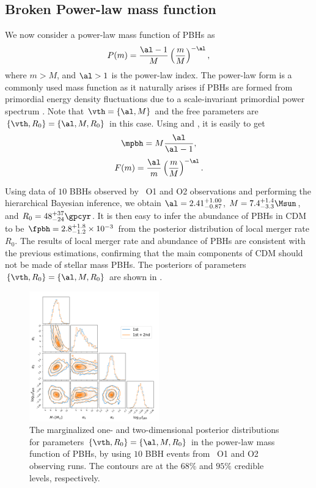 \documentclass[
reprint,           %
superscriptaddress,%
amsmath,           %
amssymb,           %
aps,               %
prd,               %
notitlepage,       %
longbibliography,  %
floatfix,          %
showkeys,          %
]{revtex4-1}
\def\({\left(}
\def\){\right)}
\def\e{\begin{equation}}
\def\q{\end{equation}}
\begin{document}
\subsection{Broken Power-law mass function}
We now consider a power-law mass function of PBHs as \cite{Carr:1975qj}
\e\label{bpower} 
P(m) = \frac{\al-1}{M} \(\frac{m}{M}\)^{-\al},
\q
where $m>M$, and $\al>1$ is the power-law index. The power-law form is a commonly used mass function as it naturally arises if PBHs are formed from primordial energy density fluctuations due to a scale-invariant primordial power spectrum \cite{Carr:2016drx,Carr:2017jsz}.
Note that $\vth=\{\al, M\}$ and the free parameters are 
$\{\vth, R_0\} = \{\al, M, R_0\}$ in this case. 
Using  and , it is easily to get
\e
\mpbh = M \frac{\al}{\al-1},
\q
\e 
F(m) = \frac{\al}{m} \(\frac{m}{M}\)^{-\al}.
\q

Using data of $10$ BBHs observed by \lvc\ O1 and O2 observations and performing
the hierarchical Bayesian inference, we obtain $\al = 2.41^{+1.00}_{-0.87}$,
$M = 7.4^{+1.4}_{-3.3} \Msun$, and $R_0 = 48^{+37}_{-24} \gpcyr$.
It is then easy to infer the abundance of PBHs in CDM to be 
$\fpbh = 2.8^{+1.8}_{-1.2} \times 10^{-3}$ from the posterior distribution of local merger rate $R_0$.
The results of local merger rate and abundance of PBHs are consistent with
the previous estimations, confirming that the main components of CDM should
not be made of stellar mass PBHs.
The posteriors of parameters $\{\vth, R_0\} = \{\al, M, R_0\}$ are shown 
in .

\begin{figure}[htbp!]
	\centering
	\includegraphics[width=0.5\textwidth]{post-bpower.pdf}
	\caption{\label{posterior-bpower}
		The marginalized one- and two-dimensional posterior distributions for 
		parameters $\{\vth, R_0\} = \{\al, M, R_0\}$ in the power-law mass function 
		of PBHs, by using $10$ BBH events from \lvc\ O1 and O2 observing runs.
		The contours are at the $68\%$ and $95\%$ credible levels, respectively. 
	}
\end{figure}
\end{document}
